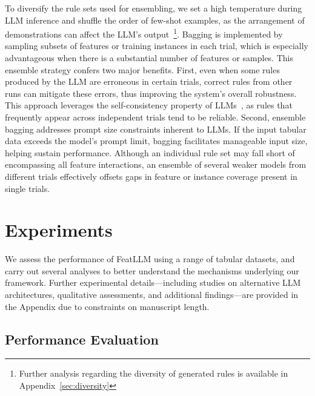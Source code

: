To diversify the rule sets used for ensembling, we set a high temperature during LLM inference and shuffle the order of few-shot examples, as the arrangement of demonstrations can affect the LLM’s output~\cite{lu2022fantastically}\footnote{Further analysis regarding the diversity of generated rules is available in Appendix~\ref{sec:diversity}}. Bagging is implemented by sampling subsets of features or training instances in each trial, which is especially advantageous when there is a substantial number of features or samples. This ensemble strategy confers two major benefits. First, even when some rules produced by the LLM are erroneous in certain trials, correct rules from other runs can mitigate these errors, thus improving the system’s overall robustness. This approach leverages the self-consistency property of LLMs~\cite{wang2022self}, as rules that frequently appear across independent trials tend to be reliable. Second, ensemble bagging addresses prompt size constraints inherent to LLMs. If the input tabular data exceeds the model’s prompt limit, bagging facilitates manageable input size, helping sustain performance. Although an individual rule set may fall short of encompassing all feature interactions, an ensemble of several weaker models from different trials effectively offsets gaps in feature or instance coverage present in single trials.

\section{Experiments}
We assess the performance of \textsf{FeatLLM} using a range of tabular datasets, and carry out several analyses to better understand the mechanisms underlying our framework. Further experimental details—including studies on alternative LLM architectures, qualitative assessments, and additional findings—are provided in the Appendix due to constraints on manuscript length.

\subsection{Performance Evaluation}
